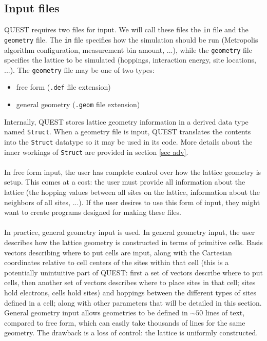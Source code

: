 \documentclass[12pt]{article}
\begin{document}
    \subsection{Input files}\label{sec config}
        QUEST requires two files for input.
        We will call these files the \texttt{in} file and the \texttt{geometry} file.
        The \texttt{in} file specifies how the simulation should be run (Metropolis algorithm configuration, measurement bin amount, ...), while the \texttt{geometry} file specifies the lattice to be simulated (hoppings, interaction energy, site locations, ...).
        The \texttt{geometry} file may be one of two types:
        \begin{itemize}
            \item free form (\texttt{.def} file extension)
            \item general geometry (\texttt{.geom} file extension)
        \end{itemize}
        Internally, QUEST stores lattice geometry information in a derived data type named \texttt{Struct}.
        When a geometry file is input, QUEST translates the contents into the \texttt{Struct} datatype so it may be used in its code.
        More details about the inner workings of \texttt{Struct} are provided in section \ref{sec adv}. \\
        \\
        In free form input, the user has complete control over how the lattice geometry is setup.
        This comes at a cost: the user must provide all information about the lattice (the hopping values between all sites on the lattice, information about the neighbors of all sites, ...).
        If the user desires to use this form of input, they might want to create programs designed for making these files. \\
        \\
        In practice, general geometry input is used.
        In general geometry input, the user describes how the lattice geometry is constructed in terms of primitive cells.
        Basis vectors describing where to put cells are input, along with the Cartesian coordinates relative to cell centers of the sites within that cell (this is a potentially unintuitive part of QUEST: first a set of vectors describe where to put cells, then another set of vectors describes where to place sites in that cell; sites hold electrons, cells hold sites) and hoppings between the different types of sites defined in a cell; along with other parameters that will be detailed in this section.
        General geometry input allows geometries to be defined in $\sim 50$ lines of text, compared to free form, which can easily take thousands of lines for the same geometry.
        The drawback is a loss of control: the lattice is uniformly constructed.
\end{document}
